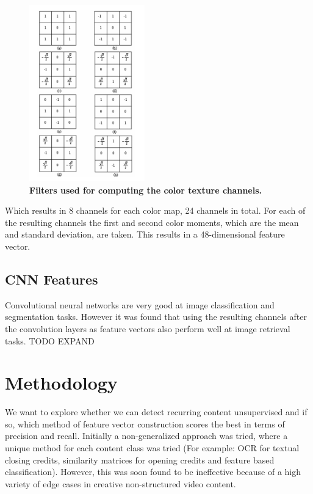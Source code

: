 \documentclass{article}
\begin{document}
\begin{figure}[H]
	\includegraphics[width=5cm]{images/filters.png}
	\centering
	\caption{\textbf{Filters used for computing the color texture channels.}}
	\label{fig:filters}
\end{figure}

Which results in 8 channels for each color map, 24 channels in total. For each of the resulting channels the first and second color moments, which are the mean and standard deviation, are taken. This results in a 48-dimensional feature vector.

\subsection{CNN Features} 
Convolutional neural networks are very good at image classification and segmentation tasks. However it was found that using the resulting channels after the convolution layers as feature vectors also perform well at image retrieval tasks.
TODO EXPAND

\section{Methodology} \label{methodology}
We want to explore whether we can detect recurring content unsupervised and if so, which method of feature vector construction scores the best in terms of precision and recall. Initially a non-generalized approach was tried, where a unique method for each content class was tried (For example: OCR for textual closing credits, similarity matrices for opening credits and feature based classification). However, this was soon found to be ineffective because of a high variety of edge cases in creative non-structured video content. 
\end{document}
